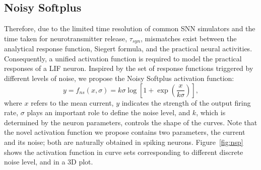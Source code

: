 	

		
	\subsection{Noisy Softplus}
	Therefore, due to the limited time resolution of common SNN simulators and the time taken for neurotransmitter release, $\tau_{syn}$, mismatches exist between the analytical response function, Siegert formula, and the practical neural activities.
	Consequently, a unified activation function is required to model the practical responses of a LIF neuron.
	Inspired by the set of response functions triggered by different levels of noise, we propose the Noisy Softplus activation function:
	\begin{equation}
	y = f_{ns}(x, \sigma) = k \sigma \log [1 + \exp(\frac{x}{k \sigma})],
	\label{equ:nsp}
	\end{equation}
	where $x$ refers to the mean current, $y$ indicates the strength of the output firing rate, $\sigma$ plays an important role to define the noise level, and $k$, which is determined by the neuron parameters, controls the shape of the curves.
	Note that the novel activation function we propose contains two parameters, the current and its noise; both are naturally obtained in spiking neurons.
	Figure~\ref{fig:nsp} shows the activation function in curve sets corresponding to different discrete noise level, and in a 3D plot.
